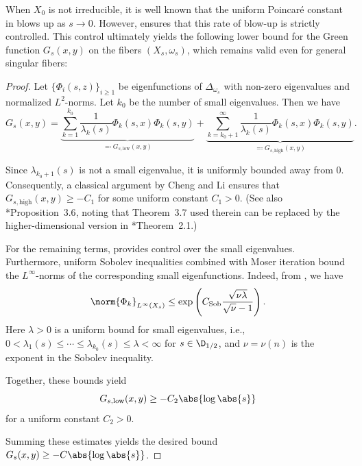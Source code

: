 \documentclass[12pt]{amsart}
\begin{document}
When $X_0$ is not irreducible, it is well known that the uniform Poincaré 
constant in  blows up as $s \to 0$. 
However,  ensures that this rate of 
blow-up is strictly controlled. This control ultimately yields the 
following lower bound for the Green function $G_s(x, y)$ on the 
fibers $(X_s, \omega_s)$, which remains valid even for general 
singular fibers:
\begin{proof}
    Let $\{\Phi_{i}(s, z)\}_{i \geq 1}$ be eigenfunctions 
    of $\Delta_{\omega_s}$ with non-zero eigenvalues
    and normalized $L^2$-norms.
    Let $k_0$ be the number of {small eigenvalues}. 
    Then we have 
    \[
    G_s(x, y) = \underbrace{\sum_{k = 1}^{k_0}\frac{1}{\lambda_k(s)} \Phi_k(s,x) \Phi_k(s,y)}_{\eqqcolon G_{s, \mathrm{low}}(x, y)}
    + \underbrace{\sum_{k = k_0 + 1}^{\infty}\frac{1}{\lambda_k(s)} \Phi_k(s,x) \Phi_k(s,y)}_{\eqqcolon G_{s, \mathrm{high}}(x, y)}.
    \]

Since $\lambda_{k_0 + 1}(s)$ is not a {small eigenvalue}, it 
    is uniformly bounded away from $0$. Consequently, a classical 
    argument by Cheng and Li \cite{Cheng_Li1981} ensures that 
    $G_{s, \mathrm{high}}(x, y) \geq -C_1$ for some uniform constant 
    $C_1 > 0$. (See also 
    \cite{Cao2026}*{Proposition~3.6}, noting that Theorem~3.7 used therein can be replaced by the higher-dimensional version in \cite{CKS87}*{Theorem~2.1}.)

    For the remaining terms,  provides control over the 
    small eigenvalues. Furthermore, uniform Sobolev 
    inequalities combined with Moser iteration bound 
    the $L^\infty$-norms of the corresponding small 
    eigenfunctions. Indeed, from , we have 
    \[
    \norm{\Phi_k}_{L^\infty(X_s)}\leq
    \exp\left(C_{\rm Sob}
    \frac{\sqrt{\nu \lambda}}{\sqrt{\nu} - 1}\right).
    \]
    Here $\lambda > 0$ is a uniform bound 
    for small eigenvalues, i.e., 
    $0 < \lambda_1(s) \leq \cdots \leq \lambda_{k_0}(s) \leq \lambda < \infty$ for $s \in \D_{1/2}$, and $\nu = \nu(n)$ is the exponent in 
    the Sobolev inequality.
    
    Together, these bounds yield 
    \[
    G_{s, \mathrm{low}}(x, y) \geq -C_2 \abs{\log \abs{s}}
    \]
    for a uniform constant $C_2 > 0$.

    Summing these estimates yields the desired bound $G_s(x, y) \geq -C \abs{\log \abs{s}}$.
\end{proof}
\end{document}
